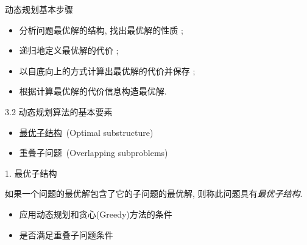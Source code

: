 \documentclass[fontset=fandol,UTF8,fleqn]{beamer}
\begin{document}
\begin{frame}{动态规划基本步骤}
\begin{itemize}[<+-|alert@+>]
\item[(1)] 分析问题最优解的结构, 找出最优解的性质 ;
\item[(2)] 递归地定义最优解的代价 ;
\item[(3)] 以自底向上的方式计算出最优解的代价并保存 ;
\item[(4)] 根据计算最优解的代价信息构造最优解.
\end{itemize}
\end{frame}

\begin{frame}{3.2 动态规划算法的基本要素}
\begin{itemize}[<+-|alert@+>]
\item \underline{最优子结构}~(Optimal substructure)
\item 重叠子问题~(Overlapping subproblems)
\end{itemize}
\end{frame}

\begin{frame}{1. 最优子结构}
\begin{definition}[最优子结构]
  如果一个问题的最优解包含了它的子问题的最优解, 则称此问题具有\emph{最优子结构}.  
\end{definition}\pause
\begin{itemize}[<+-|alert@+>]
\item 应用动态规划和贪心(Greedy)方法的条件 
\item 是否满足重叠子问题条件  
\end{itemize}
\end{frame}
\end{document}
